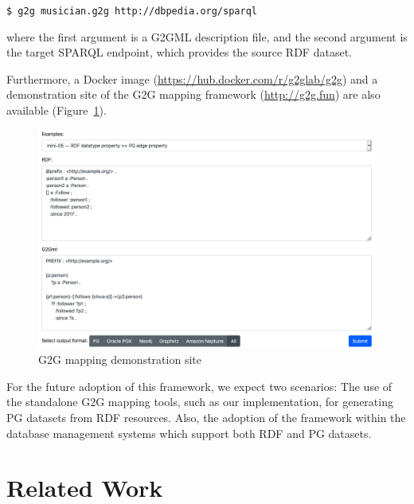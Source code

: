 \documentclass[runningheads]{llncs}
\begin{document}
\texttt{\$ g2g musician.g2g http://dbpedia.org/sparql}

\noindent where the first argument is a G2GML description file, and the second argument is the target SPARQL endpoint, which provides the source RDF dataset.

Furthermore, a Docker image (\url{https://hub.docker.com/r/g2glab/g2g}) and a demonstration site of the G2G mapping framework (\url{http://g2g.fun}) are also available (Figure~\ref{fig:sandbox}).

\begin{figure}
\center
\includegraphics[width=1.0\textwidth]{sandbox.png}
\caption{G2G mapping demonstration site}
\label{fig:sandbox}
\end{figure}

For the future adoption of this framework, we expect two scenarios: The use of the standalone G2G mapping tools, such as our implementation, for generating PG datasets from RDF resources. Also, the adoption of the framework within the database management systems which support both RDF and PG datasets.

\section{Related Work}
\end{document}

